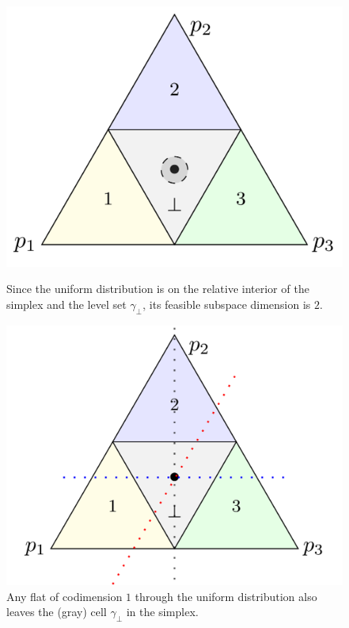 \documentclass{article}
\begin{document}
\begin{figure}
\begin{minipage}{0.45\linewidth}
	\centering
	\includegraphics[width=\linewidth]{tikz/fsd-bound.pdf}
	\caption{Since the uniform distribution is on the relative interior of the simplex and the level set $\gamma_\bot$, its feasible subspace dimension is $2$.}
	\label{fig:fsd-bound}
\end{minipage}
\hfill
\begin{minipage}{0.45\linewidth}
	\centering
	\includegraphics[width=\linewidth]{tikz/flats-bound.pdf}
	\caption{Any flat of codimension $1$ through the uniform distribution also leaves the (gray) cell $\gamma_\bot$ in the simplex.}
	\label{fig:flats-bound}
\end{minipage}
\end{figure}
\end{document}
